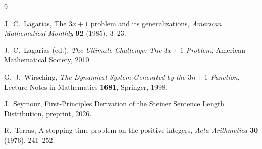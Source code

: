 \documentclass[12pt,a4paper]{article}
\begin{document}
\begin{thebibliography}{9}

J.~C.~Lagarias,
The $3x+1$ problem and its generalizations,
\textit{American Mathematical Monthly} \textbf{92} (1985), 3--23.

J.~C.~Lagarias (ed.),
\textit{The Ultimate Challenge: The $3x+1$ Problem},
American Mathematical Society, 2010.

G.~J.~Wirsching,
\textit{The Dynamical System Generated by the $3n+1$ Function},
Lecture Notes in Mathematics \textbf{1681}, Springer, 1998.

J.~Seymour,
First-Principles Derivation of the Steiner Sentence Length Distribution,
preprint, 2026.

R.~Terras,
A stopping time problem on the positive integers,
\textit{Acta Arithmetica} \textbf{30} (1976), 241--252.

\end{thebibliography}
\end{document}
